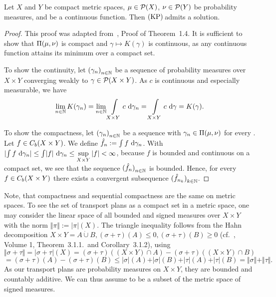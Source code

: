\begin{lemma}\label{KPAdmitCompCont}
	Let $X$ and $Y$ be compact metric spaces, $\mu \in \PM{X}$, $\nu \in \PM{Y}$ be probability measures, and  be a continuous function. Then$\text{\normalfont\ (KP)\,}$admits a solution.
\end{lemma}

\begin{proof}
	This proof was adapted from~\cite{San2015}, Proof of Theorem~1.4. It is sufficient to show that $\TP{\mu}{\nu}$ is compact and $\gamma \mapsto K(\gamma)$ is continuous, as any continuous function attains its minimum over a compact set.

	To show the continuity, let ${(\gamma_n)}_{\NinN}$ be a sequence of probability measures over $X \times Y$ converging weakly to $\gamma \in \PM{X \times Y}$. As $c$ is continuous and especially measurable, we have
	\[ \lim\limits_{\NinN} K(\gamma_n) = \lim\limits_{\NinN} \int\limits_{X \times Y} c~\D[\gamma_n] = \int\limits_{X \times Y} c~\D[\gamma] = K(\gamma). \] 
	
	To show the compactness, let ${(\gamma_n)}_{\NinN}$ be a sequence with $\gamma_n \in \TP{\mu}{\nu}$ for every \NinN. Let $f \in \CF[b]{X \times Y}$. We define $\hat{f}_n := \int f~\D[\gamma_n]$. With $\lvert \int f~\D[\gamma_n] \rvert \le \int \lvert f \rvert~\D[\gamma_n] \le \sup\limits_{X \times Y} |f| < \infty$, because $f$ is bounded and continuous on a compact set, we see that the sequence ${(\hat{f}_n)}_{\NinN}$ is bounded. Hence, for every $f \in \CF[b]{X \times Y}$ there exists a convergent subsequence ${(\hat{f}_{n_k})}_{\NinN[k]}$.
\end{proof}

Note, that compactness and sequential compactness are the same on metric spaces. To see the set of transport plans as a compact set in a metric space, one may consider the linear space of all bounded and signed measures over $X \times Y$ with the norm $\Vert \pi \Vert := |\pi|(X)$. The triangle inequality follows from the Hahn decomposition $X \times Y = A \dot{\cup} B, (\sigma + \tau)(A) \le 0, (\sigma + \tau)(B) \ge 0$ (cf.~\cite{Bog2007}, Volume 1, Theorem~3.1.1.~and Corollary~3.1.2), using
\[ \Vert \sigma + \tau \Vert = \vert \sigma + \tau \vert (X) = (\sigma + \tau)((X \times Y) \cap A) - (\sigma + \tau)((X \times Y) \cap B) \]
\[ = (\sigma + \tau)(A) - (\sigma + \tau)(B) \le \vert \sigma \vert (A) + \vert \sigma \vert (B) + \vert \tau \vert (A) + \vert \tau \vert (B) = \Vert \sigma \Vert + \Vert \tau \Vert. \]
As our transport plans are probability measures on $X \times Y$, they are bounded and countably additive. We can thus assume \TP{\mu}{\nu} to be a subset of the metric space of signed measures.

